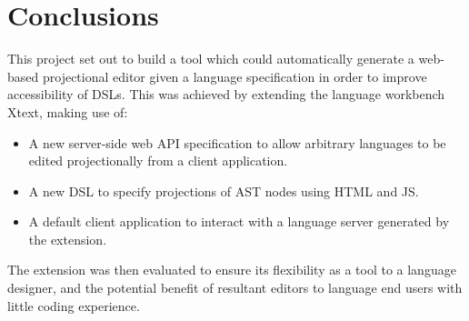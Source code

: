 \documentclass{article}
\begin{document}
{\section{Conclusions}\label{conclusion}
This project set out to build a tool which could automatically generate a web-based projectional editor given a language specification in order to improve accessibility of DSLs. This was achieved by extending the language workbench Xtext, making use of:
\begin{itemize}
\item A new server-side web API specification to allow arbitrary languages to be edited projectionally from a client application.
\item A new DSL to specify projections of AST nodes using HTML and JS.
\item A default client application to interact with a language server generated by the extension.
\end{itemize}
The extension was then evaluated to ensure its flexibility as a tool to a language designer, and the potential benefit of resultant editors to language end users with little coding experience.

}
\end{document}
